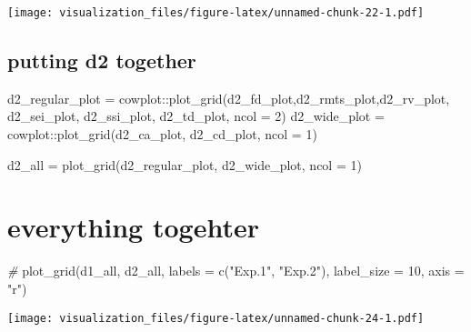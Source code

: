 \documentclass[
]{article}
\newenvironment{Shaded}{\begin{snugshade}}{\end{snugshade}}
\newcommand{\AttributeTok}[1]{\textcolor[rgb]{0.77,0.63,0.00}{#1}}
\newcommand{\CommentTok}[1]{\textcolor[rgb]{0.56,0.35,0.01}{\textit{#1}}}
\newcommand{\DecValTok}[1]{\textcolor[rgb]{0.00,0.00,0.81}{#1}}
\newcommand{\FunctionTok}[1]{\textcolor[rgb]{0.00,0.00,0.00}{#1}}
\newcommand{\NormalTok}[1]{#1}
\newcommand{\OtherTok}[1]{\textcolor[rgb]{0.56,0.35,0.01}{#1}}
\newcommand{\SpecialCharTok}[1]{\textcolor[rgb]{0.00,0.00,0.00}{#1}}
\newcommand{\StringTok}[1]{\textcolor[rgb]{0.31,0.60,0.02}{#1}}
\begin{document}
\texttt{[image: visualization\_files/figure-latex/unnamed-chunk-22-1.pdf]}

\hypertarget{putting-d2-together}{%
\subsection{putting d2 together}\label{putting-d2-together}}

\begin{Shaded}
\begin{Highlighting}[]
\NormalTok{d2\_regular\_plot }\OtherTok{=}\NormalTok{ cowplot}\SpecialCharTok{::}\FunctionTok{plot\_grid}\NormalTok{(d2\_fd\_plot,d2\_rmts\_plot,d2\_rv\_plot,}
\NormalTok{                                     d2\_sei\_plot, d2\_ssi\_plot, d2\_td\_plot, }\AttributeTok{ncol =} \DecValTok{2}\NormalTok{)}
\NormalTok{d2\_wide\_plot }\OtherTok{=}\NormalTok{ cowplot}\SpecialCharTok{::}\FunctionTok{plot\_grid}\NormalTok{(d2\_ca\_plot, d2\_cd\_plot, }\AttributeTok{ncol =} \DecValTok{1}\NormalTok{)}

\NormalTok{d2\_all }\OtherTok{=} \FunctionTok{plot\_grid}\NormalTok{(d2\_regular\_plot, d2\_wide\_plot, }\AttributeTok{ncol =} \DecValTok{1}\NormalTok{)}
\end{Highlighting}
\end{Shaded}

\hypertarget{everything-togehter}{%
\section{everything togehter}\label{everything-togehter}}

\begin{Shaded}
\begin{Highlighting}[]
\CommentTok{\#}
\FunctionTok{plot\_grid}\NormalTok{(d1\_all, d2\_all, }\AttributeTok{labels =} \FunctionTok{c}\NormalTok{(}\StringTok{"Exp.1"}\NormalTok{, }\StringTok{"Exp.2"}\NormalTok{), }\AttributeTok{label\_size =} \DecValTok{10}\NormalTok{, }\AttributeTok{axis =} \StringTok{"r"}\NormalTok{)}
\end{Highlighting}
\end{Shaded}

\texttt{[image: visualization\_files/figure-latex/unnamed-chunk-24-1.pdf]}
\end{document}
